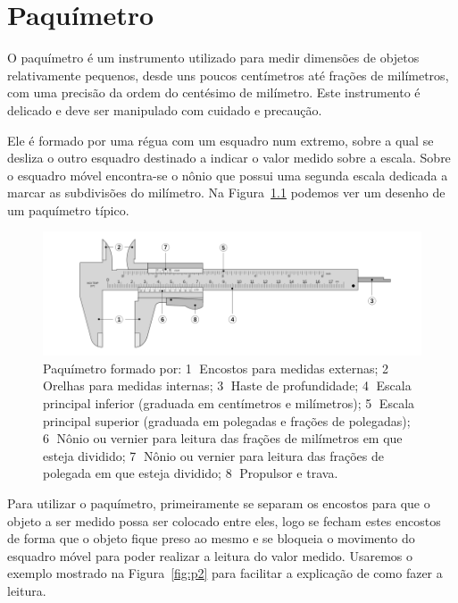 \chapter{Paquímetro}\label{paquimetro}

\vspace{-0.5cm}


O paquímetro é um instrumento utilizado para medir dimensões de objetos relativamente pequenos, desde uns poucos centímetros até frações de milímetros, com uma precisão da ordem do centésimo de milímetro. Este instrumento é delicado e deve ser manipulado com cuidado e precaução. 

Ele é formado por uma régua com um esquadro num extremo, sobre a qual se desliza o outro esquadro destinado a indicar o valor medido sobre a escala.  Sobre o esquadro móvel encontra-se o nônio que possui uma segunda escala dedicada a marcar as subdivisões do milímetro. Na Figura~\ref{fig:p1} podemos ver um desenho de um paquímetro típico.

\begin{figure}[h]
\begin{center}
\includegraphics[width=14cm]{fig/Paquimetro1}
\caption{\label{fig:p1} Paquímetro formado por: \textcircled{1} Encostos para medidas externas; \textcircled{2} Orelhas para medidas internas; \textcircled{3} Haste de profundidade; \textcircled{4} Escala principal inferior (graduada em centímetros e milímetros); \textcircled{5} Escala principal superior (graduada em polegadas e frações de polegadas); \textcircled{6} Nônio ou vernier para leitura das frações de milímetros em que esteja dividido; \textcircled{7} Nônio ou vernier para leitura das frações de polegada em que esteja dividido; \textcircled{8} Propulsor e trava.}
\vspace{-0.5cm}
\end{center}
\end{figure}

Para utilizar o paquímetro, primeiramente se separam os encostos para que o objeto a ser medido possa ser colocado entre eles, logo se fecham estes encostos de forma que o objeto fique preso ao mesmo e se bloqueia o movimento do esquadro móvel para poder realizar a leitura do valor medido. Usaremos o exemplo mostrado na Figura~\ref{fig:p2} para facilitar a explicação de como fazer a leitura. 

